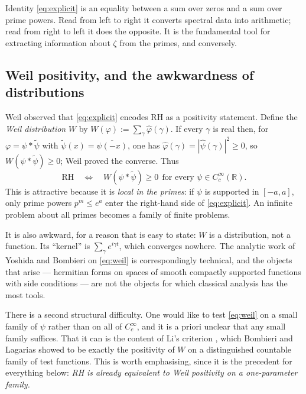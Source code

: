 \documentclass[11pt,reqno]{amsart}
\theoremstyle{plain}
\theoremstyle{definition}
\newcommand{\R}{\mathbb{R}}
\begin{document}
Identity \eqref{eq:explicit} is an equality between a sum over zeros and a sum over prime powers.
Read from left to right it converts spectral data into arithmetic; read from right to left it does
the opposite. It is the fundamental tool for extracting information about $\zeta$ from the primes,
and conversely.

\subsection{Weil positivity, and the awkwardness of distributions}

Weil observed that \eqref{eq:explicit} encodes RH as a positivity statement. Define the
\emph{Weil distribution} $W$ by $W(\varphi):=\sum_\gamma\widehat\varphi(\gamma)$. If every $\gamma$
is real then, for $\varphi=\psi*\widetilde\psi$ with $\widetilde\psi(x)=\overline{\psi(-x)}$, one has
$\widehat\varphi(\gamma)=|\widehat\psi(\gamma)|^{2}\ge0$, so $W(\psi*\widetilde\psi)\ge0$; Weil
proved the converse. Thus
\begin{equation}\label{eq:weil}
  \text{RH}\quad\Longleftrightarrow\quad
  W(\psi*\widetilde\psi)\ge0\ \ \text{for every }\psi\in C_c^\infty(\R).
\end{equation}
This is attractive because it is \emph{local in the primes}: if $\psi$ is supported in $[-a,a]$,
only prime powers $p^m\le e^{a}$ enter the right-hand side of \eqref{eq:explicit}. An infinite
problem about all primes becomes a family of finite problems.

It is also awkward, for a reason that is easy to state: $W$ is a distribution, not a function. Its
``kernel'' is $\sum_\gamma e^{i\gamma t}$, which converges nowhere. The analytic work of Yoshida
\cite{Yoshida} and Bombieri \cite{BombieriI,BombieriII} on \eqref{eq:weil} is correspondingly
technical, and the objects that arise --- hermitian forms on spaces of smooth compactly supported
functions with side conditions --- are not the objects for which classical analysis has the most
tools.

There is a second structural difficulty. One would like to test \eqref{eq:weil} on a small family of
$\psi$ rather than on all of $C_c^\infty$, and it is a priori unclear that any small family
suffices. That it can is the content of Li's criterion \cite{Li}, which Bombieri and Lagarias
\cite{BombieriLagarias} showed to be exactly the positivity of $W$ on a distinguished countable
family of test functions. This is worth emphasising, since it is the precedent for everything below:
\emph{RH is already equivalent to Weil positivity on a one-parameter family.}
\end{document}
